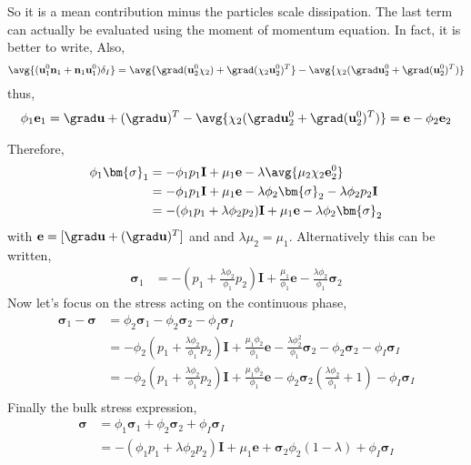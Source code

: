 So it is a mean contribution minus the particles scale dissipation. 
The last term can actually be evaluated using the moment of momentum equation. 
In fact, it is better to write, 
Also,
\begin{align}
    \avg{(\textbf{u}_1^0 \textbf{n}_1 +  \textbf{n}_1\textbf{u}_1^0)\delta_I}
    = \avg{\grad(\textbf{u}_2^0 \chi_2) +  \grad(\chi_2\textbf{u}_2^0)^T}
    - \avg{\chi_2 (\grad\textbf{u}_2^0 + \grad(\textbf{u}_2^0 )^T)}
\end{align}
thus,
\begin{align*}
    \phi_1 \textbf{e}_1
    = \grad \textbf{u}+ (\grad \textbf{u})^T
    - \avg{\chi_2 (\grad\textbf{u}_2^0 + \grad(\textbf{u}_2^0 )^T)}
    = \textbf{e}
    - \phi_2 \textbf{e}_2
\end{align*}




Therefore, 
\begin{align*}
    \phi_1 \bm{\sigma}_1 
    &= - \phi_1 p_1 \textbf{I}
    + \mu_1 \textbf{e}
    - \lambda \avg{\mu_2 \chi_2 \textbf{e}^0_2}\\
    &= - \phi_1 p_1 \textbf{I}
    + \mu_1 \textbf{e}
    - \lambda \phi_2 \bm{\sigma}_2
    - \lambda \phi_2 p_2 \textbf{I}\\
    &= - (\phi_1 p_1+ \lambda \phi_2 p_2) \textbf{I}
    + \mu_1 \textbf{e}
    - \lambda \phi_2 \bm{\sigma}_2\\
\end{align*}
with $\textbf{e} = [\grad \textbf{u}+ (\grad \textbf{u})^T]$ and 
and $\lambda \mu_2 = \mu_1$.
Alternatively  this can be written, 
\begin{align*}
    \bm{\sigma}_1 
    &= - \left(p_1 + \frac{\lambda \phi_2}{\phi_1} p_2\right) \textbf{I}
    + \frac{\mu_1}{\phi_1} \textbf{e}
    - \frac{\lambda \phi_2}{\phi_1} \bm{\sigma}_2
\end{align*}
Now let's focus on the stress acting on the continuous phase, 
\begin{align*}
    \bm{\sigma}_1 - \bm{\sigma}
    &= \phi_2 \bm{\sigma}_1  
    - \phi_2\bm{\sigma}_2 - \phi_I \bm{\sigma}_I\\
    &=- \phi_2 \left(p_1 + \frac{\lambda \phi_2}{\phi_1} p_2\right) \textbf{I}
    + \frac{\mu_1\phi_2}{\phi_1} \textbf{e}
    - \frac{\lambda \phi_2^2}{\phi_1} \bm{\sigma}_2
    - \phi_2\bm{\sigma}_2 - \phi_I \bm{\sigma}_I\\
    &=- \phi_2 \left(p_1 + \frac{\lambda \phi_2}{\phi_1} p_2\right) \textbf{I}
    + \frac{\mu_1\phi_2}{\phi_1} \textbf{e}
    - \phi_2\bm{\sigma}_2 \left(
        \frac{\lambda \phi_2}{\phi_1} + 1
    \right)
    - \phi_I \bm{\sigma}_I\\
\end{align*}
Finally the bulk stress expression, 
\begin{align*}
    \bm{\sigma}
    &= \phi_1 \bm{\sigma}_1 
    +\phi_2 \bm{\sigma}_2 
    +\phi_I \bm{\sigma}_I \\
    &= - (\phi_1 p_1 + \lambda \phi_2 p_2) \textbf{I}
    + \mu_1 \textbf{e}
    + \bm{\sigma}_2 \phi_2 (1 - \lambda)
    +\phi_I \bm{\sigma}_I \\
\end{align*}

